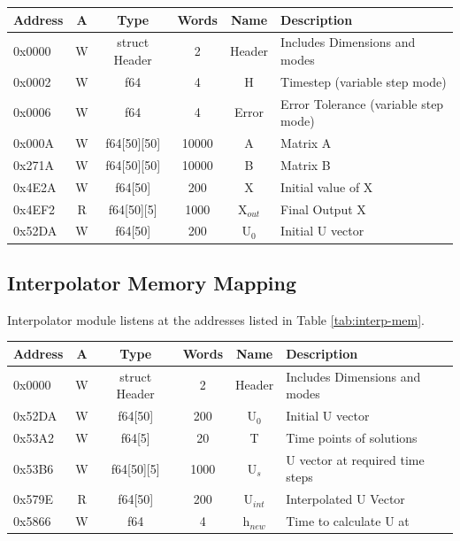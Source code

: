 \documentclass[12pt]{report}
\begin{document}
\begin{center}
 \begin{tabular}{||l| c| c| c| c| l||} 
 \hline
 Address & A & Type & Words & Name & Description  \\ [0.5ex] 
 \hline\hline
  0x0000 & W & struct Header & 2 & Header & Includes Dimensions and modes  \\ 
 \hline
 0x0002  & W & f64 & 4 & H & Timestep (variable step mode)  \\
 \hline
 0x0006  & W & f64 & 4 & Error & Error Tolerance (variable step mode) \\
 \hline
 0x000A  & W & f64[50][50] & 10000 & A & Matrix A \\
 \hline
 0x271A  & W & f64[50][50] & 10000 & B & Matrix B \\
 \hline
 0x4E2A  & W & f64[50] & 200 & X & Initial value of X \\
 \hline
 0x4EF2  & R & f64[50][5] & 1000 & X$_{out}$ & Final Output X \\
 \hline
 0x52DA  & W & f64[50] & 200 & U$_{0}$ & Initial U vector \\
 \hline
\end{tabular}
\end{center}

\subsection{Interpolator Memory Mapping}
Interpolator module listens at the addresses listed in Table \ref{tab:interp-mem}.

\begin{center}
 \begin{tabular}{||l |c| c| c| c| l||} 
 \hline
 Address & A & Type & Words & Name & Description  \\ [0.5ex] 
 \hline\hline
  0x0000 & W & struct Header & 2 & Header & Includes Dimensions and modes  \\ 
  \hline
  0x52DA  & W & f64[50] & 200 & U$_0$ & Initial U vector \\
 \hline
 0x53A2  & W & f64[5] & 20 & T & Time points of solutions  \\
 \hline
 0x53B6  & W & f64[50][5] & 1000 & U$_s$ & U vector at required time steps \\
 \hline
 0x579E  & R & f64[50] & 200 & U$_{int}$ & Interpolated U Vector \\
 \hline
 0x5866  & W & f64 & 4 & h$_{new}$ & Time to calculate U at \\
 \hline
\end{tabular}
\end{center}
\end{document}
